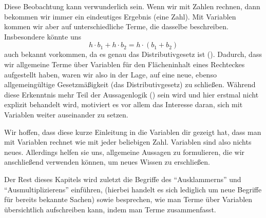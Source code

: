 \documentclass[../../main.tex]{subfiles}
\begin{document}
    Diese Beobachtung kann verwunderlich sein. Wenn wir mit Zahlen rechnen, dann bekommen wir immer ein eindeutiges Ergebnis (eine Zahl).
    Mit Variablen kommen wir aber auf unterschiedliche Terme, die dasselbe beschreiben.
    Insbesondere könnte uns
    \[h\cdot b_1 + h \cdot b_2 = h\cdot (b_1 + b_2)\]
    auch bekannt vorkommen, da es genau das Distributivgesetz ist (\mayberef).
    Dadurch, dass wir allgemeine Terme über Variablen für den Flächeninhalt eines Rechteckes aufgestellt haben,
    waren wir also in der Lage, auf eine neue, ebenso allgemeingültige Gesetzmäßigkeit (das Distributivgesetz) zu schließen.
    Während diese Erkenntnis mehr Teil der Aussagenlogik (\mayberef) sein wird und hier erstmal nicht explizit behandelt wird,
    motiviert es vor allem das Interesse daran, sich mit Variablen weiter auseinander zu setzen.

    Wir hoffen, dass diese kurze Einleitung in die Variablen dir gezeigt hat, dass man mit Variablen rechnet wie mit jeder beliebigen Zahl.
    Variablen sind also nichts neues. Allerdings helfen sie uns, allgemeine Aussagen zu formulieren, die wir anschließend verwenden können,
    um neues Wissen zu erschließen.

    Der Rest dieses Kapitels wird zuletzt die Begriffe des \enquote{Ausklammerns} und \enquote{Ausmultiplizierens} einführen,
    (hierbei handelt es sich lediglich um neue Begriffe für bereits bekannte Sachen)
    sowie besprechen, wie man Terme über Variablen übersichtlich aufschreiben kann, indem man Terme zusammenfasst.
\end{document}
